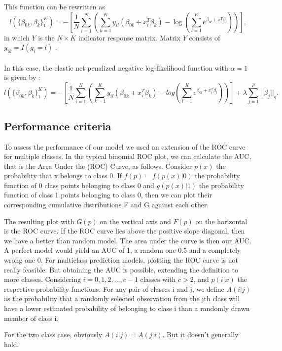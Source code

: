 \noindent
This function can be rewritten as 
$$l(\{\beta_{0k},\beta_k\}_1^K)=-\left[ \frac{1}{N} \sum_{i=1}^N\left( \sum_{k=1}^Ky_{il}(\beta_{0k}+x_i^T\beta_k)-\log\left(\sum_{l=1}^K e^{\beta_{0l}+x_i^T\beta_l}\right)\right)\right],$$
in which $Y$ is the $N\times K$ indicator response matrix. Matrix $Y$ consists of $y_{ik}=I(g_i=l)$ \parencite{Friedman_2010}. 
\\\\
In this case, the elastic net penalized negative log-likelihood function with $\alpha=1$ is given by \parencite{hastie2016introduction}:
$$l(\{\beta_{0k},\beta_k\}_1^K)=-\left[ \frac{1}{N} \sum_{i=1}^N\left( \sum_{k=1}^Ky_{il}(\beta_{0k}+x_i^T\beta_k)-log\left(\sum_{l=1}^K e^{\beta_{0l}+x_i^T\beta_l}\right)\right)\right] + \lambda \sum_{j=1}^p ||\beta_j||_q.$$


\subsection{Performance criteria}
To assess the performance of our model we used an extension of the ROC curve for multiple classes. In the typical binomial ROC plot, we can calculate the AUC, that is the Area Under the (ROC) Curve, as follows. Consider $p(x)$ the probability that x belongs to class 0. If $f(p)=f(p(x)|0)$ the probability function of 0 class points belonging to class 0 and $g(p(x)|1)$ the probability function of class 1 points belonging to class 0, then we can plot their corresponding cumulative distributions F and G against each other.

The resulting plot with $G(p)$ on the vertical axis and $F(p)$ on the horizontal is the ROC curve. If the ROC curve lies above the positive slope diagonal, then we have a better than random model. The area under the curve is then our AUC. A perfect model would yield an AUC of 1, a random one 0.5 and a completely wrong one 0.
For multiclass prediction models, plotting the ROC curve is not really feasible. But obtaining the AUC is possible, extending the definition to more classes. Considering $i=0,1,2,...,c-1$ classes with $c>2$, and $p(i|x)$ the respective probability functions. For any pair of classes i and j, we define $A(i|j)$ as the probability that a randomly selected observation from the jth class will have a lower estimated probability of belonging to class i than a randomly drawn member of class i.

For the two class case, obviously $A(i|j) = A(j|i)$. But it doesn't generally hold.


